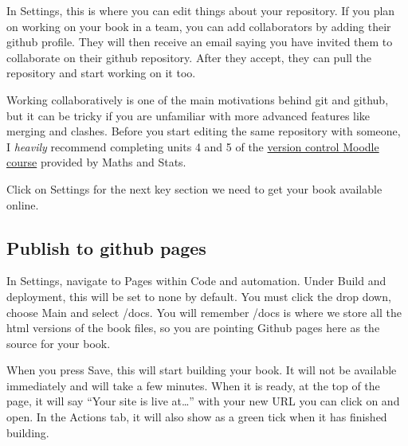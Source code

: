 \documentclass[
  letterpaper,
  DIV=11,
  numbers=noendperiod]{scrreprt}
\begin{document}
In Settings, this is where you can edit things about your repository. If
you plan on working on your book in a team, you can add collaborators by
adding their github profile. They will then receive an email saying you
have invited them to collaborate on their github repository. After they
accept, they can pull the repository and start working on it too.

\begin{tcolorbox}[enhanced jigsaw, colbacktitle=quarto-callout-warning-color!10!white, titlerule=0mm, leftrule=.75mm, title=\textcolor{quarto-callout-warning-color}{\faExclamationTriangle}\hspace{0.5em}{Warning}, breakable, bottomrule=.15mm, opacitybacktitle=0.6, rightrule=.15mm, opacityback=0, arc=.35mm, colframe=quarto-callout-warning-color-frame, toptitle=1mm, bottomtitle=1mm, toprule=.15mm, left=2mm, colback=white, coltitle=black]

Working collaboratively is one of the main motivations behind git and
github, but it can be tricky if you are unfamiliar with more advanced
features like merging and clashes. Before you start editing the same
repository with someone, I \emph{heavily} recommend completing units 4
and 5 of the \hyperref[github_prep]{version control Moodle course}
provided by Maths and Stats.

\end{tcolorbox}

Click on Settings for the next key section we need to get your book
available online.

\subsection{Publish to github pages}\label{publish-to-github-pages}

In Settings, navigate to Pages within Code and automation. Under Build
and deployment, this will be set to none by default. You must click the
drop down, choose Main and select /docs. You will remember /docs is
where we store all the html versions of the book files, so you are
pointing Github pages here as the source for your book.

When you press Save, this will start building your book. It will not be
available immediately and will take a few minutes. When it is ready, at
the top of the page, it will say ``Your site is live at\ldots{}'' with
your new URL you can click on and open. In the Actions tab, it will also
show as a green tick when it has finished building.
\end{document}
